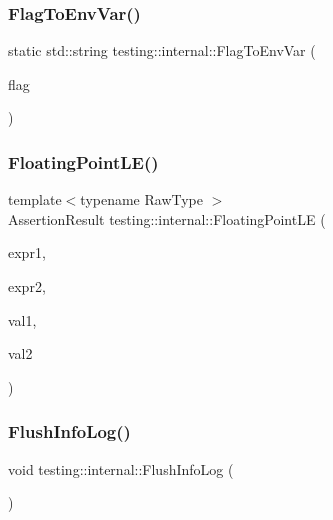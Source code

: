 \mbox{\label{namespacetesting_1_1internal_a7540386ecf74d7ab7e2fa6089db94682}} 
\subsubsection{\texorpdfstring{FlagToEnvVar()}{FlagToEnvVar()}}
{\footnotesize\ttfamily static std\+::string testing\+::internal\+::\+Flag\+To\+Env\+Var (\begin{DoxyParamCaption}\item[{const char $\ast$}]{flag }\end{DoxyParamCaption})\hspace{0.3cm}{\ttfamily [static]}}

\mbox{\label{namespacetesting_1_1internal_a17b52b6b1f81f6dcad5cc4d12e5173a6}} 
\subsubsection{\texorpdfstring{FloatingPointLE()}{FloatingPointLE()}}
{\footnotesize\ttfamily template$<$typename Raw\+Type $>$ \\
Assertion\+Result testing\+::internal\+::\+Floating\+Point\+LE (\begin{DoxyParamCaption}\item[{const char $\ast$}]{expr1,  }\item[{const char $\ast$}]{expr2,  }\item[{Raw\+Type}]{val1,  }\item[{Raw\+Type}]{val2 }\end{DoxyParamCaption})}

\mbox{\label{namespacetesting_1_1internal_a2135f223bf6b527729aeaa651115183b}} 
\subsubsection{\texorpdfstring{FlushInfoLog()}{FlushInfoLog()}}
{\footnotesize\ttfamily void testing\+::internal\+::\+Flush\+Info\+Log (\begin{DoxyParamCaption}{ }\end{DoxyParamCaption})\hspace{0.3cm}{\ttfamily [inline]}}

